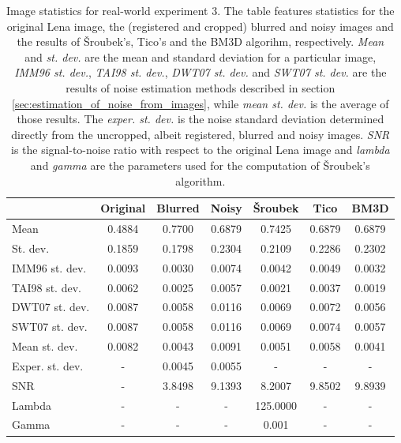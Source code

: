 \documentclass[12pt,notitlepage]{report}
\begin{document}
\begin{table}[htb]
	\centering
	\begin{tabular}{ | l | c | c | c | c | c | c | }
	\hline
		           & Original & Blurred & Noisy  & Šroubek & Tico   & BM3D   \\ \hline 
	Mean           & 0.4884   & 0.7700  & 0.6879 & 0.7425  & 0.6879 & 0.6879 \\ \hline 
	St. dev.       & 0.1859   & 0.1798  & 0.2304 & 0.2109  & 0.2286 & 0.2302 \\ \hline 
	IMM96 st. dev. & 0.0093   & 0.0030  & 0.0074 & 0.0042  & 0.0049 & 0.0032 \\ \hline 
	TAI98 st. dev. & 0.0062   & 0.0025  & 0.0057 & 0.0021  & 0.0037 & 0.0019 \\ \hline 
	DWT07 st. dev. & 0.0087   & 0.0058  & 0.0116 & 0.0069  & 0.0072 & 0.0056 \\ \hline 
	SWT07 st. dev. & 0.0087   & 0.0058  & 0.0116 & 0.0069  & 0.0074 & 0.0057 \\ \hline 
	Mean st. dev.  & 0.0082   & 0.0043  & 0.0091 & 0.0051  & 0.0058 & 0.0041 \\ \hline 
	Exper. st. dev.& -        & 0.0045  & 0.0055 & -       & -      & -      \\ \hline 
	SNR            & -        & 3.8498  & 9.1393 & 8.2007  & 9.8502 & 9.8939 \\ \hline 
	Lambda         & -        & -       & -      & 125.0000& -      & -      \\ \hline 
	Gamma          & -        & -       & -      & 0.001   & -      & -      \\ \hline 

	\end{tabular}
	\caption[Image statistics for real-world experiment 3]{Image statistics for real-world experiment 3. The table features statistics for the original Lena image, the (registered and cropped) blurred and noisy images and the results of Šroubek's, Tico's and the BM3D algorihm, respectively. {\em Mean} and {\em st. dev.} are the mean and standard deviation for a particular image, {\em IMM96 st. dev.}, {\em TAI98 st. dev.}, {\em DWT07 st. dev.} and {\em SWT07 st. dev.} are the results of noise estimation methods described in section \ref{sec:estimation_of_noise_from_images}, while {\em mean st. dev.} is the average of those results. The {\em exper. st. dev.} is the noise standard deviation determined directly from the uncropped, albeit registered, blurred and noisy images. {\em SNR} is the signal-to-noise ratio with respect to the original Lena image and {\em lambda} and {\em gamma} are the parameters used for the computation of Šroubek's algorithm.}
	\label{tab:experiment_003_statistics}
\end{table}
\end{document}
